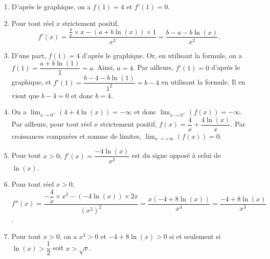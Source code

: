 \documentclass[11pt,fleqn, openany]{book} %
\begin{document}
\begin{solution}\hspace{0pt}

\begin{enumerate}\item D'après le graphique, on a \(f(1)=4\) et \(f'(1)=0\).
	\item Pour tout réel \(x\) strictement positif,
	\[f'(x)=\dfrac{\frac{b}{x} \times x - (a+b\ln(x)) \times 1}{x^2}=\dfrac{b-a-b\ln(x)}{x^2}.\]
	\item D'une part, \(f(1)=4\) d'après le graphique. Or, en utilisant la formule, on a \(f(1)=\dfrac{a+b\ln(1)}{1}=a\). Ainsi, \(a=4\). Par ailleurs, \(f'(1)=0\) d'après le graphique, et \(f'(1)=\dfrac{b-4-b\ln(1)}{1^2}=b-4\) en utilisant la formule. Il en vient que \(b-4=0\) et donc \(b=4\).
	\item On a \(\displaystyle\lim_{x \to 0^+}(4+4\ln(x))=-\infty\) et donc \(\displaystyle\lim_{x \to 0^+}(f(x))=-\infty\). Par ailleurs, pour tout réel \(x\) strictement positif, \(f(x)=\dfrac{4}{x}+\dfrac{4\ln(x)}{x}\). Par croissances comparées et somme de limites, \(\displaystyle\lim_{x \to +\infty}(f(x))=0\).
	\item Pour tout \(x>0\), \(f'(x)=\dfrac{-4\ln(x)}{x^2}\) est du signe opposé à celui de \(\ln(x)\).

		
\begin{center}\end{center}


\item Pour tout réel $x>0$, $f''(x)=\dfrac{-\dfrac{4}{x} \times x^2 - (-4\ln(x))\times 2x}{(x^2)^2}=\dfrac{x(-4+8\ln(x))}{x^4}=\dfrac{-4+8\ln(x)}{x^3}$.

\item Pour tout $x>0$, on a $x^3>0$ et $-4+8\ln(x)>0$ si et seulement si $\ln(x) > \dfrac{1}{2}$ soit $x>\sqrt{e}$.

\begin{center}\end{center}

\end{enumerate}
\end{solution}
\end{document}
